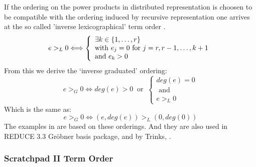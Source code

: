 If the ordering on the power products
in distributed representation
is choosen to be compatible with the ordering
induced by recursive representation one arrives 
at the so called 'inverse lexicographical' term order 
\cite{Gebauer Kredel 83}.
\begin{displaymath}
 e >_L 0 \Longleftrightarrow
   \left\{
   \begin{array}{l}
   \exists k \in \{1,\ldots,r\} \\
   {\rm with} \ e_j = 0 \ {\rm for} \ j=r,r-1,\ldots,k+1 \\
   {\rm and} \ e_k > 0
   \end{array}
   \right.
\end{displaymath}
From this we derive the `inverse graduated' ordering:
\begin{displaymath}
 e >_G 0 \Longleftrightarrow
 deg(e) > 0 \ \mbox{ or } \
   \left\{
   \begin{array}{l}
     deg(e) = 0 \\
     \mbox{ and } \\
     e >_L 0
   \end{array}
   \right.
\end{displaymath}
Which is the same as:
\begin{displaymath}
 e >_G 0
 \Longleftrightarrow
 (e,deg(e)) >_L (0,deg(0))
\end{displaymath}
The examples in
\cite{BGK 86}
are based on these orderings.
And they are also used in REDUCE 3.3 Gr\"obner basis package,
and by Trinks,
\cite{Hearn 87,Trinks 78}.

\subsubsection{Scratchpad II Term Order}

